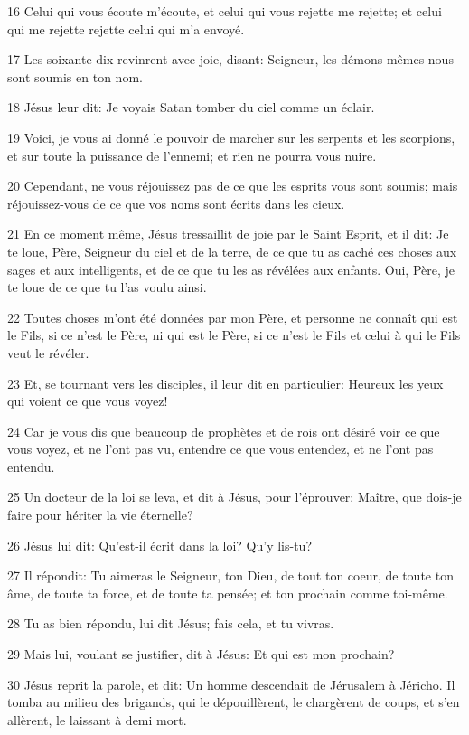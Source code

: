 \par 16 Celui qui vous écoute m'écoute, et celui qui vous rejette me rejette; et celui qui me rejette rejette celui qui m'a envoyé.
\par 17 Les soixante-dix revinrent avec joie, disant: Seigneur, les démons mêmes nous sont soumis en ton nom.
\par 18 Jésus leur dit: Je voyais Satan tomber du ciel comme un éclair.
\par 19 Voici, je vous ai donné le pouvoir de marcher sur les serpents et les scorpions, et sur toute la puissance de l'ennemi; et rien ne pourra vous nuire.
\par 20 Cependant, ne vous réjouissez pas de ce que les esprits vous sont soumis; mais réjouissez-vous de ce que vos noms sont écrits dans les cieux.
\par 21 En ce moment même, Jésus tressaillit de joie par le Saint Esprit, et il dit: Je te loue, Père, Seigneur du ciel et de la terre, de ce que tu as caché ces choses aux sages et aux intelligents, et de ce que tu les as révélées aux enfants. Oui, Père, je te loue de ce que tu l'as voulu ainsi.
\par 22 Toutes choses m'ont été données par mon Père, et personne ne connaît qui est le Fils, si ce n'est le Père, ni qui est le Père, si ce n'est le Fils et celui à qui le Fils veut le révéler.
\par 23 Et, se tournant vers les disciples, il leur dit en particulier: Heureux les yeux qui voient ce que vous voyez!
\par 24 Car je vous dis que beaucoup de prophètes et de rois ont désiré voir ce que vous voyez, et ne l'ont pas vu, entendre ce que vous entendez, et ne l'ont pas entendu.
\par 25 Un docteur de la loi se leva, et dit à Jésus, pour l'éprouver: Maître, que dois-je faire pour hériter la vie éternelle?
\par 26 Jésus lui dit: Qu'est-il écrit dans la loi? Qu'y lis-tu?
\par 27 Il répondit: Tu aimeras le Seigneur, ton Dieu, de tout ton coeur, de toute ton âme, de toute ta force, et de toute ta pensée; et ton prochain comme toi-même.
\par 28 Tu as bien répondu, lui dit Jésus; fais cela, et tu vivras.
\par 29 Mais lui, voulant se justifier, dit à Jésus: Et qui est mon prochain?
\par 30 Jésus reprit la parole, et dit: Un homme descendait de Jérusalem à Jéricho. Il tomba au milieu des brigands, qui le dépouillèrent, le chargèrent de coups, et s'en allèrent, le laissant à demi mort.
